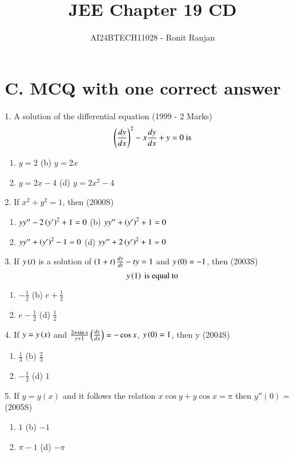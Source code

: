 \documentclass[journal,12pt,twocolumn]{IEEEtran}
\theoremstyle{remark}
\begin{document}

\vspace{3cm}

\title{JEE Chapter 19 CD}
\author{AI24BTECH11028 - Ronit Ranjan}
\maketitle
\newpage
\bigskip
\section*{C. MCQ with one correct answer}

1. A solution of the differential equation \hfill (1999 - 2 Marks)
\[
\left(\frac{dy}{dx}\right)^2 - x \frac{dy}{dx} + y = 0 \text{ is}
\]
\begin{enumerate}[label=(\alph*)]
    \item $y = 2$ \quad \quad \quad \quad (b) $y = 2x$
    \item $y = 2x - 4$ \quad \quad (d) $y = 2x^2 - 4$
\end{enumerate}

2. If $x^2 + y^2 = 1$, then \hfill (2000S)
\begin{enumerate}[label=(\alph*)]
    \item $yy'' - 2\left(y'\right)^2 + 1 = 0$ \quad \quad (b) $yy'' + \left(y'\right)^2 + 1 = 0$
    \item $yy'' + \left(y'\right)^2 - 1 = 0$ \quad (d) $yy'' + 2\left(y'\right)^2 + 1 = 0$
\end{enumerate}

3. If $y\left(t\right)$ is a solution of $\left(1 + t\right) \frac{dy}{dt} - ty = 1$ and $y\left(0\right) = -1$, then \hfill (2003S)
\[
y\left(1\right) \text{ is equal to}
\]
\begin{enumerate}[label=(\alph*)]
    \item $-\frac{1}{2}$ \quad \quad \quad \quad (b) $e + \frac{1}{2}$
    \item $e - \frac{1}{2}$ \quad \quad \quad (d) $\frac{1}{2}$
\end{enumerate}

4. If $y = y\left(x\right)$ and $\frac{2 + \sin x}{y + 1}\left(\frac{dy}{dx}\right) = -\cos x$, $y\left(0\right) = 1$, then y \hfill (2004S)

\begin{enumerate}[label=(\alph*)]
    \item $\frac{1}{3}$ \quad \quad \quad (b) $\frac{2}{3}$
    \item $-\frac{1}{3}$ \quad \quad (d) $1$
\end{enumerate}
5. If $y = y(x)$ and it follows the relation $x \cos y + y \cos x = \pi$ then $y''(0) =$ \hfill (2005S)
\begin{enumerate}[label=(\alph*)]
    \item $1$ \quad \quad \quad (b) $-1$
    \item $\pi - 1$ \quad \quad (d) $-\pi$
\end{enumerate}
\end{document}
